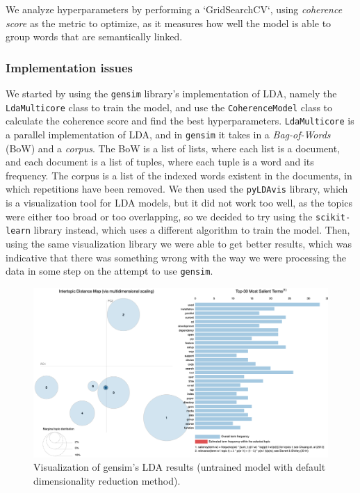 \documentclass[conference, onecolumn]{IEEEtran}
\begin{document}
We analyze hyperparameters by performing a `GridSearchCV`, using
\textit{coherence score} as the metric to optimize, as it measures how well the
model is able to group words that are semantically linked.

\subsubsection{Implementation issues} \label{sec:methodology:statistics-issues}

We started by using the \verb|gensim| library's implementation of LDA, namely
the \verb|LdaMulticore| class to train the model, and use the
\verb|CoherenceModel| class to calculate the coherence score and find the best
hyperparameters.
\verb|LdaMulticore| is a parallel implementation of LDA, and in \verb|gensim|
it takes in a \textit{Bag-of-Words} (BoW) and a \textit{corpus}.
The BoW is a list of lists, where each list is a document, and each document is
a list of tuples, where each tuple is a word and its frequency.
The corpus is a list of the indexed words existent in the documents, in which
repetitions have been removed.
We then used the \verb|pyLDAvis| library, which is a visualization tool for LDA
models, but it did not work too well, as the topics were either too broad or
too overlapping, so we decided to try using the \verb|scikit-learn| library
instead, which uses a different algorithm to train the model.
Then, using the same visualization library we were able to get better results,
which was indicative that there was something wrong with the way we were
processing the data in some step on the attempt to use \verb|gensim|.

\begin{figure}[H]
    \centering
    \includegraphics[width=\linewidth]{gensim-untrained.png}
    \caption{Visualization of gensim's LDA results (untrained model with
        default dimensionality reduction method).}
    \label{fig:lda_gensim_untrained}
\end{figure}
\end{document}
